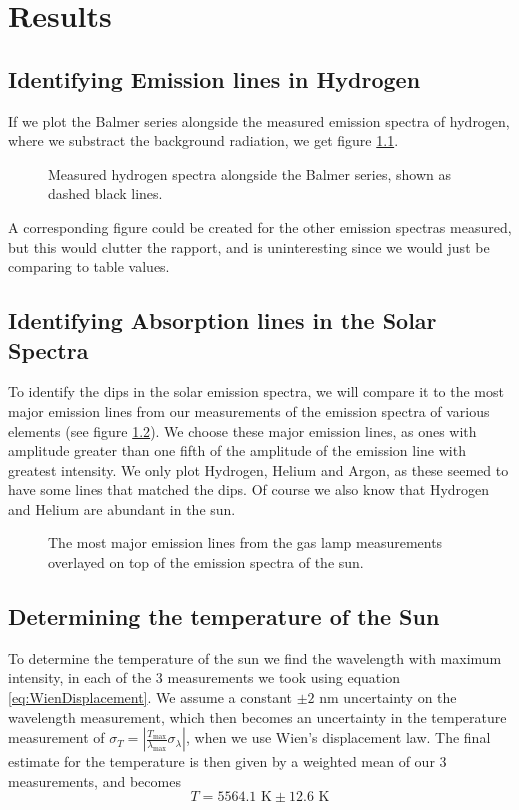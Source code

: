 \chapter{Results}
\section{Identifying Emission lines in Hydrogen}
If we plot the Balmer series alongside the measured emission spectra of hydrogen, where we substract the background radiation,
we get figure \ref{fig:HydrogenBalmer}.
\begin{figure}
    \centering
    
    \caption{Measured hydrogen spectra alongside the Balmer series, shown as dashed black lines.}
    \label{fig:HydrogenBalmer}
\end{figure}
A corresponding figure could be created for the other emission spectras measured, but this would clutter the rapport, and is uninteresting since we would just be comparing to table values.
\section{Identifying Absorption lines in the Solar Spectra}
To identify the dips in the solar emission spectra, we will compare it to the most major emission lines from our measurements of the emission spectra of various elements (see figure \ref{fig:SunComparison}).
We choose these major emission lines, as ones with amplitude greater than one fifth of the amplitude of the emission line with greatest intensity.
We only plot Hydrogen, Helium and Argon, as these seemed to have some lines that matched the dips. Of course we also know that Hydrogen and Helium are abundant in the sun.
\begin{figure}
    \centering
    
    \caption{The most major emission lines from the gas lamp measurements overlayed on top of the emission spectra of the sun.}
    \label{fig:SunComparison}
\end{figure}
\section{Determining the temperature of the Sun}
To determine the temperature of the sun we find the wavelength with maximum intensity, 
in each of the 3 measurements we took using equation \eqref{eq:WienDisplacement}.
We assume a constant $\pm 2 \text{ nm}$ uncertainty on the wavelength measurement,
which then becomes an uncertainty in the temperature measurement of $\sigma_T = |\frac{T_\text{max}}{\lambda_\text{max}}\sigma_\lambda|$, when we use Wien's displacement law.
The final estimate for the temperature is then given by a weighted mean of our 3 measurements, and becomes 
\[T = 5564.1 \text{ K} \pm 12.6 \text{ K}\]
